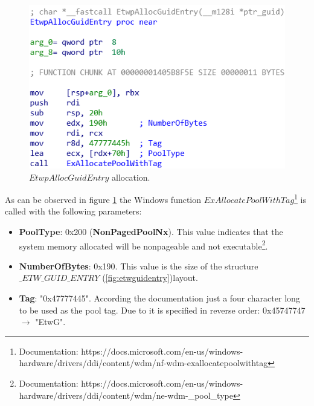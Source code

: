   \begin{centering}
    \begin{figure}[H]
      \includegraphics[width=12cm]{images/etwpallocguidentry.png}
      \caption[]{$EtwpAllocGuidEntry$ allocation.}
      \label{fig:etwallocguidentry}
    \end{figure}
  \end{centering}

As can be observed in figure \ref{fig:etwallocguidentry} the Windows function $ExAllocatePoolWithTag$\footnote{Documentation: https://docs.microsoft.com/en-us/windows-hardware/drivers/ddi/content/wdm/nf-wdm-exallocatepoolwithtag} is called with the following parameters:
\begin{itemize}
\item {\bfseries PoolType}: 0x200 ({\bfseries NonPagedPoolNx}). This value indicates that the system memory allocated will be nonpageable and not executable\footnote{Documentation: https://docs.microsoft.com/en-us/windows-hardware/drivers/ddi/content/wdm/ne-wdm-\_pool\_type}.
\item {\bfseries NumberOfBytes}: 0x190. This value is the size of the structure $\_ETW\_GUID\_ENTRY$ (\ref{fig:etwguidentry})layout.
\item {\bfseries Tag}: "0x47777445". According the documentation just a four character long to be used as the pool tag. Due to it is specified in reverse order: 0x45747747 $\rightarrow$ "EtwG".
\end{itemize}

